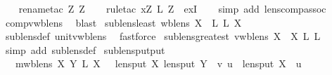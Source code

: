 \begin{isabellebody}
\ \ \isamarkupfalse%
\ {\isacharparenleft}rename{\isacharunderscore}tac\ Z\ Z\isanewline
\ \ \isamarkupfalse%
\ {\isacharparenleft}rule{\isacharunderscore}tac\ x{\isacharequal}{\isachardoublequoteopen}Z\ {\isacharsemicolon}\isactrlsub L\ Z\ \ exI{\isacharparenright}\isanewline
\ \ \isamarkupfalse%
\ {\isacharparenleft}simp\ add{\isacharcolon}\ lens{\isacharunderscore}comp{\isacharunderscore}assoc{\isacharparenright}\isanewline
\ \ \isamarkupfalse%
\ comp{\isacharunderscore}vwb{\isacharunderscore}lens\ \isamarkupfalse%
\ blast\isanewline
{}\isamarkupfalse%
%
\endisatagproof
{\isafoldproof}%
%
\isadelimproof
\isanewline
%
\endisadelimproof
\isanewline
{}\isamarkupfalse%
\ sublens{\isacharunderscore}least{\isacharcolon}\ {\isachardoublequoteopen}wb{\isacharunderscore}lens\ X\ {\isasymLongrightarrow}\ {}\isactrlsub L\ {\isasymsubseteq}\isactrlsub L\ X{\isachardoublequoteclose}\isanewline
%
\isadelimproof
\ \ %
\endisadelimproof
%
\isatagproof
{}\isamarkupfalse%
\ sublens{\isacharunderscore}def\ unit{\isacharunderscore}vwb{\isacharunderscore}lens\ \isamarkupfalse%
\ fastforce%
\endisatagproof
{\isafoldproof}%
%
\isadelimproof
\isanewline
%
\endisadelimproof
\isanewline
{}\isamarkupfalse%
\ sublens{\isacharunderscore}greatest{\isacharcolon}\ {\isachardoublequoteopen}vwb{\isacharunderscore}lens\ X\ {\isasymLongrightarrow}\ X\ {\isasymsubseteq}\isactrlsub L\ {}\isactrlsub L{\isachardoublequoteclose}\isanewline
%
\isadelimproof
\ \ %
\endisadelimproof
%
\isatagproof
{}\isamarkupfalse%
\ {\isacharparenleft}simp\ add{\isacharcolon}\ sublens{\isacharunderscore}def{\isacharparenright}%
\endisatagproof
{\isafoldproof}%
%
\isadelimproof
\isanewline
%
\endisadelimproof
\isanewline
{}\isamarkupfalse%
\ sublens{\isacharunderscore}put{\isacharunderscore}put{\isacharcolon}\isanewline
\ \ {\isachardoublequoteopen}{\isasymlbrakk}\ mwb{\isacharunderscore}lens\ X{\isacharsemicolon}\ Y\ {\isasymsubseteq}\isactrlsub L\ X\ {\isasymrbrakk}\ {\isasymLongrightarrow}\ lens{\isacharunderscore}put\ X\ {\isacharparenleft}lens{\isacharunderscore}put\ Y\ {\isasymsigma}\ v{\isacharparenright}\ u\ {\isacharequal}\ lens{\isacharunderscore}put\ X\ {\isasymsigma}\ u{\isachardoublequoteclose}\isanewline
%
\isadelimproof

\end{isabellebody}
